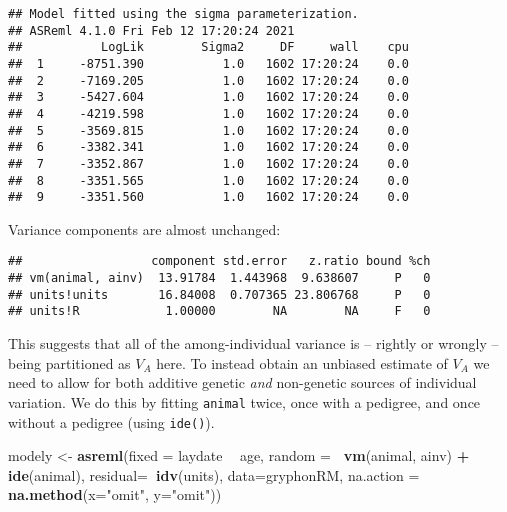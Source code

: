 \documentclass[12pt,]{book}
\newenvironment{Shaded}{\begin{snugshade}}{\end{snugshade}}
\newcommand{\DataTypeTok}[1]{\textcolor[rgb]{0.13,0.29,0.53}{#1}}
\newcommand{\KeywordTok}[1]{\textcolor[rgb]{0.13,0.29,0.53}{\textbf{#1}}}
\newcommand{\NormalTok}[1]{#1}
\newcommand{\OperatorTok}[1]{\textcolor[rgb]{0.81,0.36,0.00}{\textbf{#1}}}
\newcommand{\StringTok}[1]{\textcolor[rgb]{0.31,0.60,0.02}{#1}}
\begin{document}
\begin{verbatim}
## Model fitted using the sigma parameterization.
## ASReml 4.1.0 Fri Feb 12 17:20:24 2021
##           LogLik        Sigma2     DF     wall    cpu
##  1     -8751.390           1.0   1602 17:20:24    0.0
##  2     -7169.205           1.0   1602 17:20:24    0.0
##  3     -5427.604           1.0   1602 17:20:24    0.0
##  4     -4219.598           1.0   1602 17:20:24    0.0
##  5     -3569.815           1.0   1602 17:20:24    0.0
##  6     -3382.341           1.0   1602 17:20:24    0.0
##  7     -3352.867           1.0   1602 17:20:24    0.0
##  8     -3351.565           1.0   1602 17:20:24    0.0
##  9     -3351.560           1.0   1602 17:20:24    0.0
\end{verbatim}

Variance components are almost unchanged:

\begin{Shaded}
\end{Shaded}

\begin{verbatim}
##                  component std.error   z.ratio bound %ch
## vm(animal, ainv)  13.91784  1.443968  9.638607     P   0
## units!units       16.84008  0.707365 23.806768     P   0
## units!R            1.00000        NA        NA     F   0
\end{verbatim}

This suggests that all of the among-individual variance is -- rightly or wrongly -- being partitioned as \(V_A\) here. To instead obtain an unbiased estimate of \(V_A\) we need to allow for both additive genetic \emph{and} non-genetic sources of individual variation. We do this by fitting \texttt{animal} twice, once with a pedigree, and once without a pedigree (using \texttt{ide()}).

\begin{Shaded}
\begin{Highlighting}[]
\NormalTok{modely <-}\StringTok{ }\KeywordTok{asreml}\NormalTok{(}\DataTypeTok{fixed =}\NormalTok{ laydate }\OperatorTok{~}\StringTok{ }\NormalTok{age,}
                 \DataTypeTok{random =}\OperatorTok{~}\StringTok{ }\KeywordTok{vm}\NormalTok{(animal, ainv) }\OperatorTok{+}\StringTok{ }\KeywordTok{ide}\NormalTok{(animal),}
                 \DataTypeTok{residual=}\OperatorTok{~}\KeywordTok{idv}\NormalTok{(units),}
                 \DataTypeTok{data=}\NormalTok{gryphonRM,}
                 \DataTypeTok{na.action =} \KeywordTok{na.method}\NormalTok{(}\DataTypeTok{x=}\StringTok{"omit"}\NormalTok{, }\DataTypeTok{y=}\StringTok{"omit"}\NormalTok{))}
\end{Highlighting}
\end{Shaded}
\end{document}
